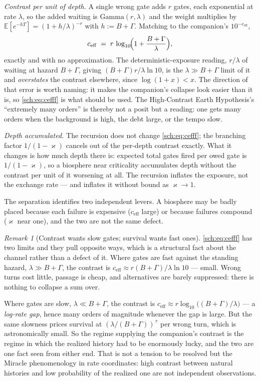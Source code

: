 \documentclass[11pt]{article}
\numberwithin{equation}{section}
\theoremstyle{plain}
\theoremstyle{definition}
\theoremstyle{remark}
\newtheorem{remark}[theorem]{Remark}
\newcommand{\E}{\mathbb{E}}
\begin{document}
\emph{Contrast per unit of depth.} A single wrong gate adds $r$ gates,
each exponential at rate $\lambda$, so the added waiting is
$\mathrm{Gamma}(r,\lambda)$ and the weight multiplies by
$\E[e^{-hT}]=(1+h/\lambda)^{-r}$ with $h:=B+\Gamma$. Matching to the
companion's $10^{-c_{\mathrm{eff}}}$,
\begin{equation}\label{sch:eq:cefff}
c_{\mathrm{eff}}\;=\;r\,\log_{10}\!\Bigl(1+\frac{B+\Gamma}{\lambda}\Bigr),
\end{equation}
exactly and with no approximation. The deterministic-exposure reading, $r/\lambda$ of waiting at hazard $B+\Gamma$, giving
$(B+\Gamma)r/\lambda\ln10$, is the $\lambda\gg B+\Gamma$ limit of it
and \emph{overstates} the contrast elsewhere, since $\log(1+x)<x$. The
direction of that error is worth naming: it makes the companion's
collapse look easier than it is, so \eqref{sch:eq:cefff} is what should
be used. The High-Contrast Earth
Hypothesis's ``extremely many orders'' is thereby not a posit but a
reading: one gets many orders when the background is high, the debt
large, or the tempo slow.

\emph{Depth accumulated.} The recursion does not change
\eqref{sch:eq:cefff}; the branching factor $1/(1-\varkappa)$ cancels out of the
per-depth contrast exactly. What it changes is how much depth there is:
expected total gates fired per owed gate is $1/(1-\varkappa)$, so a biosphere
near criticality accumulates depth without the contrast per unit of it
worsening at all. The recursion inflates the exposure, not the exchange
rate --- and inflates it without bound as $\varkappa\to1$.

The separation identifies two independent levers. A biosphere may be
badly placed because each failure is expensive ($c_{\mathrm{eff}}$
large) or because failures compound ($\varkappa$ near one), and the two are not
the same defect.

\begin{remark}[Contrast wants slow gates; survival wants fast ones]
\label{sch:rem:tension}
\eqref{sch:eq:cefff} has two limits and they pull opposite ways, which
is a structural fact about the channel rather than a defect of it. Where gates are fast against the standing hazard, $\lambda\gg B+\Gamma$,
the contrast is $c_{\mathrm{eff}}\approx r(B+\Gamma)/\lambda\ln10$ ---
small. Wrong turns cost little, passage is cheap, and alternatives are
barely suppressed: there is nothing to collapse a sum over.

Where gates are slow, $\lambda\ll B+\Gamma$, the contrast is
$c_{\mathrm{eff}}\approx r\log_{10}\bigl((B+\Gamma)/\lambda\bigr)$ --- a
\emph{log-rate gap}, hence many orders of magnitude whenever the gap is
large. But the same slowness prices survival at
$(\lambda/(B+\Gamma))^{\,r}$ per wrong turn, which is astronomically
small. So the regime supplying the companion's contrast is the regime in which
the realized history had to be enormously lucky, and the two are one
fact seen from either end. That is not a tension to be resolved but the
Miracle phenomenology in rate coordinates: high contrast between natural
histories and low probability of the realized one are not independent
observations.
\end{remark}
\end{document}
